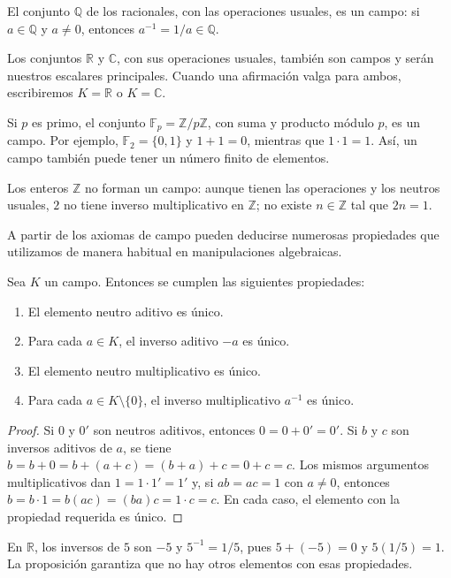 \begin{example}
El conjunto $\mathbb{Q}$ de los racionales, con las operaciones usuales, es un campo: si $a\in\mathbb{Q}$ y $a\neq0$, entonces $a^{-1}=1/a\in\mathbb{Q}$.
\end{example}
\begin{example}
Los conjuntos $\mathbb{R}$ y $\mathbb{C}$, con sus operaciones usuales, también son campos y serán nuestros escalares principales. Cuando una afirmación valga para ambos, escribiremos $K=\mathbb{R}$ o $K=\mathbb{C}$.
\end{example}
\begin{example}
Si $p$ es primo, el conjunto $\mathbb{F}_p=\mathbb{Z}/p\mathbb{Z}$, con suma y producto módulo $p$, es un campo. Por ejemplo, $\mathbb{F}_2=\{0,1\}$ y $1+1=0$, mientras que $1\cdot1=1$. Así, un campo también puede tener un número finito de elementos.
\end{example}
\begin{example}
Los enteros $\mathbb{Z}$ no forman un campo: aunque tienen las operaciones y los neutros usuales, $2$ no tiene inverso multiplicativo en $\mathbb{Z}$; no existe $n\in\mathbb{Z}$ tal que $2n=1$.
\end{example}
A partir de los axiomas de campo pueden deducirse numerosas propiedades que utilizamos de manera habitual en manipulaciones algebraicas.
\begin{proposition}
Sea $K$ un campo. Entonces se cumplen las siguientes propiedades:
\begin{enumerate}
\item[a)] El elemento neutro aditivo es único.
\item[b)] Para cada $a\in K$, el inverso aditivo $-a$ es único.
\item[c)] El elemento neutro multiplicativo es único.
\item[d)] Para cada $a\in K\setminus\{0\}$, el inverso multiplicativo $a^{-1}$ es único.
\end{enumerate}
\end{proposition}
\begin{proof}
Si $0$ y $0'$ son neutros aditivos, entonces $0=0+0'=0'$. Si $b$ y $c$ son inversos aditivos de $a$, se tiene $b=b+0=b+(a+c)=(b+a)+c=0+c=c$. Los mismos argumentos multiplicativos dan $1=1\cdot1'=1'$ y, si $ab=ac=1$ con $a\neq0$, entonces $b=b\cdot1=b(ac)=(ba)c=1\cdot c=c$. En cada caso, el elemento con la propiedad requerida es único.
\end{proof}
\begin{example}
En $\mathbb{R}$, los inversos de $5$ son $-5$ y $5^{-1}=1/5$, pues $5+(-5)=0$ y $5(1/5)=1$. La proposición garantiza que no hay otros elementos con esas propiedades.
\end{example}
